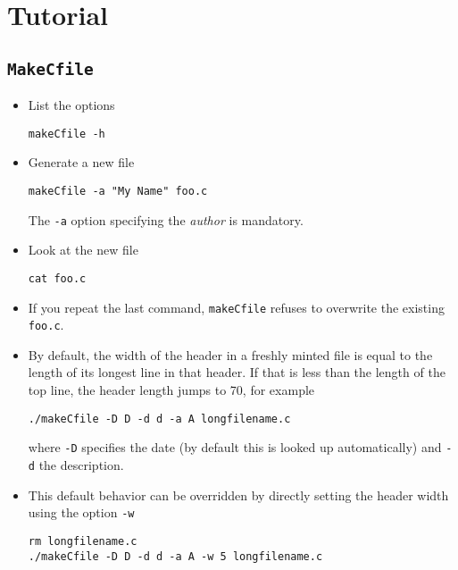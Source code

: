 \documentclass[a4paper, english]{article}
\begin{document}
\section{Tutorial}
\subsection{\texttt{MakeCfile}}
\begin{itemize}
\item List the options
\begin{verbatim}
makeCfile -h
\end{verbatim}
\item Generate a new file
\begin{verbatim}
makeCfile -a "My Name" foo.c
\end{verbatim}
The \texttt{-a} option specifying the \emph{author} is mandatory.
\item Look at the new file
\begin{verbatim}
cat foo.c
\end{verbatim}
\item If you repeat the last command, \texttt{makeCfile} refuses to
  overwrite the existing \texttt{foo.c}.
\item By default, the width of the header in a freshly minted file is
  equal to the length of its longest line in that header. If that is
  less than the length of the top line, the header length jumps to 70,
  for example
\begin{verbatim}
./makeCfile -D D -d d -a A longfilename.c
\end{verbatim}
where \texttt{-D} specifies the date (by default this is looked up
automatically) and \texttt{-d} the description.
\item This default behavior can be overridden by directly setting the header
  width using the option \texttt{-w}
\begin{verbatim}
rm longfilename.c
./makeCfile -D D -d d -a A -w 5 longfilename.c
\end{verbatim}
\end{itemize}
\end{document}
